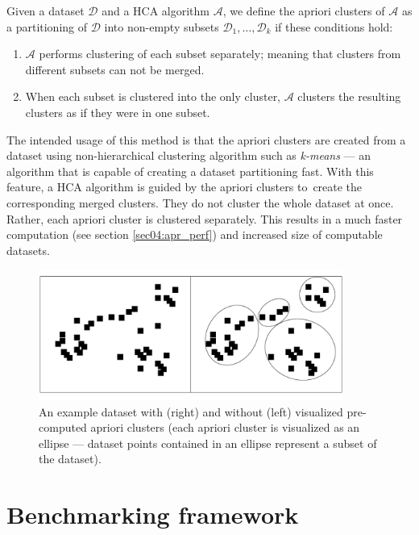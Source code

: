 \begin{defn}
	Given a dataset $\mathcal{D}$ and a HCA algorithm $\mathcal{A}$, we define the apriori clusters of $\mathcal{A}$ as a partitioning of  $\mathcal{D}$ into non-empty subsets $\mathcal{D}_1,\dots,\mathcal{D}_k$    if these conditions hold:
	\begin{enumerate}
		\item $\mathcal{A}$ performs clustering of each subset separately; meaning that clusters from different subsets can not be merged.
		\item When each subset is clustered into the only cluster, $\mathcal{A}$ clusters the resulting clusters as if they were in one subset.
	\end{enumerate}
	\label{def03:apriori}
\end{defn}

The intended usage of this method is that the apriori clusters are created from a dataset using non-hierarchical clustering algorithm such as \emph{k-means} --- an algorithm that is capable of creating a dataset partitioning fast. With this feature, a HCA algorithm is guided by the apriori clusters to~create the corresponding merged clusters. They do not cluster the whole dataset at once. Rather, each apriori cluster is clustered separately. This results in a much faster computation (see section \ref{sec04:apr_perf}) and increased size of computable datasets. 

\begin{figure}\centering
	\includegraphics[width=10cm]{img/apriori_example}
	\caption{An example dataset with (right) and without (left) visualized pre-computed apriori clusters (each apriori cluster is visualized as an ellipse --- dataset points contained in an ellipse represent a subset of the dataset).}
	\label{fig03:apr_ex}
\end{figure}

\section{Benchmarking framework}

